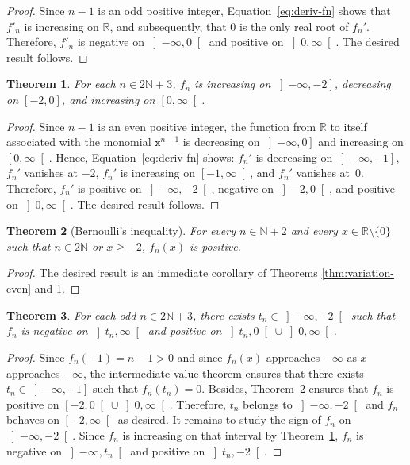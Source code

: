\documentclass[12pt]{article}
\newcommand{\bR}{\mathbb{R}}
\newcommand{\bN}{\mathbb{N}}
\newcommand{\gtint}[1]{\left] #1, \infty \right[}
\newcommand{\geint}[1]{\left[ #1, \infty \right[}
\newcommand{\ltint}[1]{\left]- \infty, #1 \right[}
\newcommand{\leint}[1]{\left]- \infty, #1 \right]}
\newcommand{\ttx}{\mathtt{x}}
\newtheorem{theorem}{Theorem}
\begin{document}
 \begin{proof}
   Since $n - 1$ is an odd positive integer,
   Equation~\eqref{eq:deriv-fn} shows that
   $f'_n$ is increasing on $\bR$,
   and subsequently, that
   $0$ is the only real root of $f_n'$.
   Therefore,
   $f'_n$ is negative on $\ltint{0}$
   and 
   positive on $\gtint{0}$.
   The desired result follows.
 \end{proof}


 \begin{theorem} \label{thm:variation-odd}
   For each $n \in 2 \bN + 3$, $f_n$ is
   increasing on $\leint{- 2}$,
   decreasing on $[- 2, 0]$, and
   increasing on $\geint{0}$.
 \end{theorem}

 \begin{proof}
   Since $n - 1$ is an even positive integer,
   the function from $\bR$ to itself associated with the monomial $\ttx^{n - 1}$ is
   decreasing on $\leint{0}$ and
   increasing on $\geint{0}$.
   Hence, 
   Equation~\eqref{eq:deriv-fn} shows: 
   $f_n'$ is decreasing on $\leint{- 1}$,
   $f_n'$ vanishes at $- 2$,
   $f_n'$ is increasing on $\geint{- 1}$, and
   $f_n'$ vanishes at~$0$.
   Therefore, $f_n'$ is positive on $\ltint{- 2}$,
   negative on $\left]- 2, 0 \right[$, and
   positive on $\gtint{0}$.
   The desired result follows.
 \end{proof}

 \begin{theorem}[Bernoulli's inequality]
   \label{thm:Bernoulli}
   For every $n \in \bN + 2$ and every $x \in \bR \setminus \{ 0 \}$ such that $n \in 2 \bN$ or $x \ge - 2$,
   $f_n(x)$ is positive.
 \end{theorem}

 \begin{proof}
   The desired result is an immediate corollary of Theorems \ref{thm:variation-even} and \ref{thm:variation-odd}.
 \end{proof}
 
 
 \begin{theorem} \label{thm:tipping-point}
   For each odd  $n \in 2 \bN + 3$,
   there exists $t_n \in \ltint{- 2}$ such that $f_n$ is 
   negative on $\gtint{t_n}$
   and
   positive on $\left]t_n, 0 \right[ \cup \gtint{0}$.
 \end{theorem} 

 \begin{proof}
   Since $f_n(- 1) = n - 1 > 0$ and since $f_n(x)$ approaches $- \infty$ as $x$ approaches $- \infty$,
   the intermediate value theorem ensures that there exists $t_n \in \leint{- 1}$ such that $f_n(t_n) = 0$.
   Besides, Theorem~\ref{thm:Bernoulli} ensures that
   $f_n$ is positive on $\left[-2, 0 \right[ \cup \gtint{0}$.
   Therefore, $t_n$ belongs to $\ltint{- 2}$ and
   $f_n$ behaves on $\geint{- 2}$ as desired.
   It remains to study the sign of $f_n$ on $\ltint{-2}$.
   Since $f_n$ is increasing on that interval by Theorem~\ref{thm:variation-odd},
   $f_n$ is negative on $\ltint{t_n}$ and
   positive on $\left]t_n, - 2 \right[$.
 \end{proof}
\end{document}
